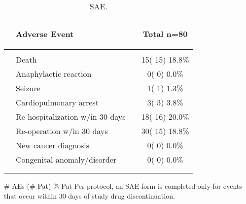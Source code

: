 \documentclass[dvips,10pt]{article}
\begin{document}
\begin{table}[t]
\caption
{ SAE. }
\begin{center}
\begin{tabular}{ @{}l@{}
@{}l@{}@{}p{1.5em}@{}@{}c@{}
}
\hline

& \parbox{6em}{\begin{center}Adverse Event\end{center}} && \parbox{6em}{\begin{center}Total n=80\end{center}} \\

\hline

\\
& Death && 15( 15) 18.8\% \\
& Anaphylactic reaction && 0(  0)  0.0\% \\
& Seizure && 1(  1)  1.3\% \\
& Cardiopulmonary arrest && 3(  3)  3.8\% \\
& Re-hospitalization w/in 30 days && 18( 16) 20.0\% \\
& Re-operation w/in 30 days && 30( 15) 18.8\% \\
& New cancer diagnosis && 0(  0)  0.0\% \\
& Congenital anomaly/disorder && 0(  0)  0.0\% \\
\\
\hline \\

\end{tabular}


\parbox{ 5in }{ \# AEs (\# Pat) \% Pat \newline Per protocol, an SAE form is completed only for events that occur within 30
  days of study drug discontinuation. } \\
 \vspace{1em}\end{center}
 \end{table}
\end{document}
